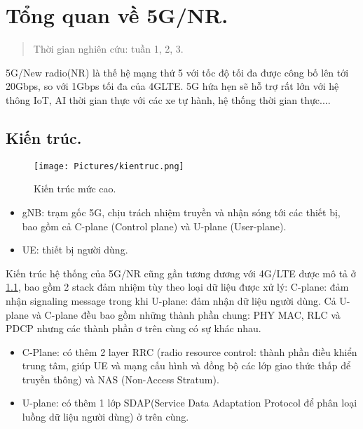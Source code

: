 \chapter{Tổng quan về 5G/NR.}
\begin{quote}
    Thời gian nghiên cứu: tuần 1, 2, 3.
\end{quote}

5G/New radio(NR) là thế hệ mạng thứ 5 với tốc độ tối đa được công bố lên tới 20Gbps, so với 1Gbps tối đa của 4GLTE. 5G hứa hẹn sẽ hỗ trợ rất lớn với hệ thông IoT, AI thời gian thực với các xe tự hành, hệ thống thời gian thực....

\section{Kiến trúc.}
\begin{figure}
    \centering
    \texttt{[image: Pictures/kientruc.png]}
    \caption{Kiến trúc mức cao.}
    \label{fig:kientruc}
\end{figure}
\begin{itemize}
    \item gNB: trạm gốc 5G, chịu trách nhiệm truyền và nhận sóng tới các thiết bị, bao gồm cả C-plane (Control plane) và U-plane (User-plane).
    \item UE: thiết bị người dùng.
\end{itemize}

Kiến trúc hệ thống của 5G/NR cũng gần tương đương với 4G/LTE được mô tả ở \ref{fig:kientruc}, bao gồm 2 stack đảm nhiệm tùy theo loại dữ liệu được xử lý: C-plane: đảm nhận signaling message trong khi U-plane: đảm nhận dữ liệu người dùng. Cả U-plane và C-plane đều bao gồm những thành phần chung: PHY MAC, RLC và PDCP nhưng các thành phần ơ trên cùng có sự khác nhau. \begin{itemize}
    \item C-Plane: có thêm 2 layer RRC (radio resource control: thành phần điều khiển trung tâm, giúp UE và mạng cấu hình và đồng bộ các lớp giao thức thấp để truyền thông) và NAS (Non-Access Stratum).
    \item U-plane: có thêm 1 lớp SDAP(Service Data Adaptation Protocol để phân loại luồng dữ liệu người dùng) ở trên cùng.
\end{itemize}
